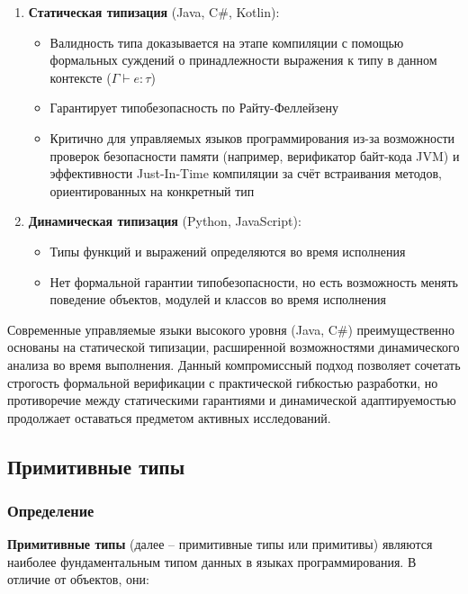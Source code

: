 \begin{enumerate}[label=\arabic*., leftmargin=*]
    \item \textbf{Статическая типизация} (Java, C\#, Kotlin):
    \begin{itemize}
        \item Валидность типа доказывается на этапе компиляции с помощью формальных суждений о принадлежности выражения к типу в данном контексте ($\Gamma \vdash e : \tau$)
        \item Гарантирует типобезопасность по Райту-Феллейзену
        \item Критично для управляемых языков программирования из-за возможности проверок безопасности памяти (например, верификатор байт-кода JVM) и эффективности Just-In-Time компиляции за счёт встраивания методов, ориентированных на конкретный тип
    \end{itemize}

    \item \textbf{Динамическая типизация} (Python, JavaScript):
    \begin{itemize}
        \item Типы функций и выражений определяются во время исполнения
        \item Нет формальной гарантии типобезопасности, но есть возможность менять поведение объектов, модулей и классов во время исполнения
    \end{itemize}
\end{enumerate}

Современные управляемые языки высокого уровня (Java, C\#) преимущественно основаны на статической типизации, расширенной возможностями динамического анализа во время выполнения. Данный компромиссный подход позволяет сочетать строгость формальной верификации с практической гибкостью разработки, но противоречие между статическими гарантиями и динамической адаптируемостью продолжает оставаться предметом активных исследований.

\newpage



\subsection{Примитивные типы}

\subsubsection{Определение}

\textbf{Примитивные типы} (далее -- примитивные типы или примитивы) являются наиболее фундаментальным типом данных в языках программирования. В отличие от объектов, они:

